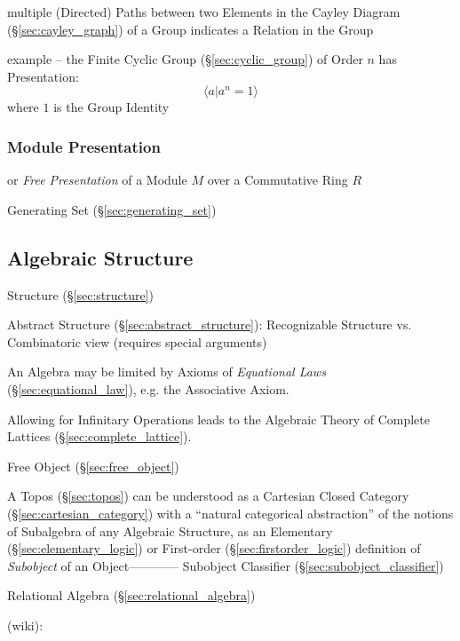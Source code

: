 multiple (Directed) Paths between two Elements in the Cayley Diagram
(\S\ref{sec:cayley_graph}) of a Group indicates a Relation in the Group

example -- the Finite Cyclic Group (\S\ref{sec:cyclic_group}) of Order $n$ has
Presentation:
\[
  \langle{a | a^n = 1}\rangle
\]
where $1$ is the Group Identity



\subsubsection{Module Presentation}\label{sec:module_presentation}

or \emph{Free Presentation} of a Module $M$ over a Commutative Ring $R$

Generating Set (\S\ref{sec:generating_set})



\subsection{Algebraic Structure}\label{sec:algebraic_structure}

Structure (\S\ref{sec:structure})

Abstract Structure (\S\ref{sec:abstract_structure}): Recognizable Structure vs.
Combinatoric view (requires special arguments)

An Algebra may be limited by Axioms of \emph{Equational Laws}
(\S\ref{sec:equational_law}), e.g. the Associative Axiom.

Allowing for Infinitary Operations leads to the Algebraic Theory of Complete
Lattices (\S\ref{sec:complete_lattice}).

Free Object (\S\ref{sec:free_object})

\fist A Topos (\S\ref{sec:topos}) can be understood as a Cartesian Closed
Category (\S\ref{sec:cartesian_category}) with a ``natural categorical
abstraction'' of the notions of Subalgebra of any Algebraic Structure, as an
Elementary (\S\ref{sec:elementary_logic}) or First-order
(\S\ref{sec:firstorder_logic}) definition of \emph{Subobject} of an
Object------------ Subobject Classifier (\S\ref{sec:subobject_classifier})

\fist Relational Algebra (\S\ref{sec:relational_algebra})

(wiki):

